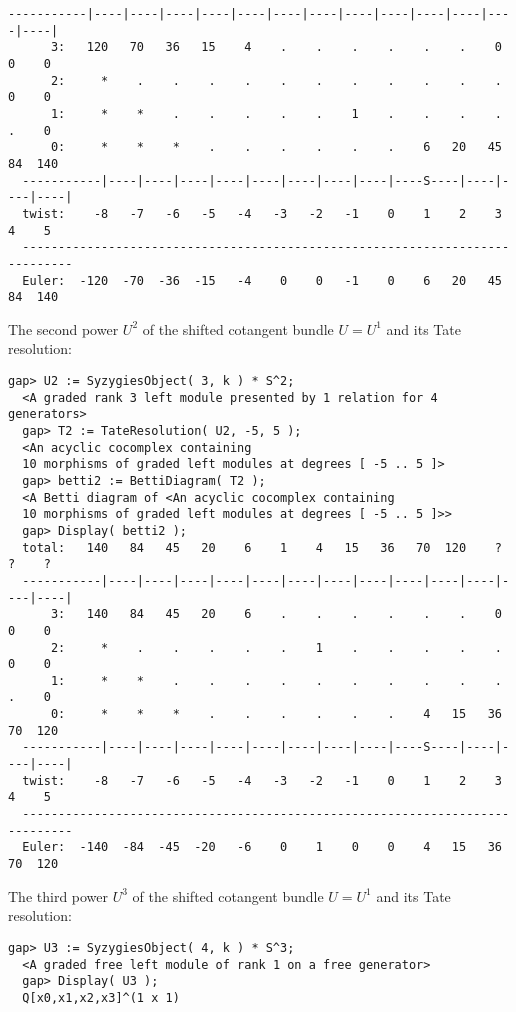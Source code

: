 \documentclass[a4paper,11pt]{report}
\begin{document}
{{{\begin{Verbatim}[fontsize=\small,frame=single,label=Example]
  -----------|----|----|----|----|----|----|----|----|----|----|----|----|----|
      3:   120   70   36   15    4    .    .    .    .    .    .    0    0    0
      2:     *    .    .    .    .    .    .    .    .    .    .    .    0    0
      1:     *    *    .    .    .    .    .    1    .    .    .    .    .    0
      0:     *    *    *    .    .    .    .    .    .    6   20   45   84  140
  -----------|----|----|----|----|----|----|----|----|----S----|----|----|----|
  twist:    -8   -7   -6   -5   -4   -3   -2   -1    0    1    2    3    4    5
  -----------------------------------------------------------------------------
  Euler:  -120  -70  -36  -15   -4    0    0   -1    0    6   20   45   84  140
\end{Verbatim}
 The second power $U^2$ of the shifted cotangent bundle $U=U^1$ and its Tate resolution: 
\begin{Verbatim}[fontsize=\small,frame=single,label=Example]
  gap> U2 := SyzygiesObject( 3, k ) * S^2;
  <A graded rank 3 left module presented by 1 relation for 4 generators>
  gap> T2 := TateResolution( U2, -5, 5 );
  <An acyclic cocomplex containing
  10 morphisms of graded left modules at degrees [ -5 .. 5 ]>
  gap> betti2 := BettiDiagram( T2 );
  <A Betti diagram of <An acyclic cocomplex containing 
  10 morphisms of graded left modules at degrees [ -5 .. 5 ]>>
  gap> Display( betti2 );
  total:   140   84   45   20    6    1    4   15   36   70  120    ?    ?    ?
  -----------|----|----|----|----|----|----|----|----|----|----|----|----|----|
      3:   140   84   45   20    6    .    .    .    .    .    .    0    0    0
      2:     *    .    .    .    .    .    1    .    .    .    .    .    0    0
      1:     *    *    .    .    .    .    .    .    .    .    .    .    .    0
      0:     *    *    *    .    .    .    .    .    .    4   15   36   70  120
  -----------|----|----|----|----|----|----|----|----|----S----|----|----|----|
  twist:    -8   -7   -6   -5   -4   -3   -2   -1    0    1    2    3    4    5
  -----------------------------------------------------------------------------
  Euler:  -140  -84  -45  -20   -6    0    1    0    0    4   15   36   70  120
\end{Verbatim}
 The third power $U^3$ of the shifted cotangent bundle $U=U^1$ and its Tate resolution: 
\begin{Verbatim}[fontsize=\small,frame=single,label=Example]
  gap> U3 := SyzygiesObject( 4, k ) * S^3;
  <A graded free left module of rank 1 on a free generator>
  gap> Display( U3 );
  Q[x0,x1,x2,x3]^(1 x 1)
  

\end{Verbatim}}}}
\end{document}
